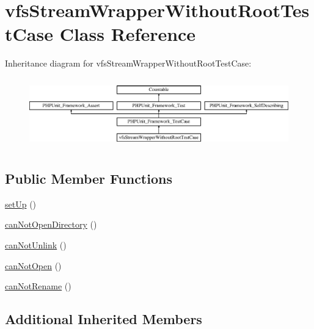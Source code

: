 \hypertarget{classorg_1_1bovigo_1_1vfs_1_1vfs_stream_wrapper_without_root_test_case}{}\section{vfs\+Stream\+Wrapper\+Without\+Root\+Test\+Case Class Reference}
\label{classorg_1_1bovigo_1_1vfs_1_1vfs_stream_wrapper_without_root_test_case}
Inheritance diagram for vfs\+Stream\+Wrapper\+Without\+Root\+Test\+Case\+:\begin{figure}[H]
\begin{center}
\leavevmode
\includegraphics[height=3.072702cm]{classorg_1_1bovigo_1_1vfs_1_1vfs_stream_wrapper_without_root_test_case}
\end{center}
\end{figure}
\subsection*{Public Member Functions}
\begin{DoxyCompactItemize}
\item 
\mbox{\hyperlink{classorg_1_1bovigo_1_1vfs_1_1vfs_stream_wrapper_without_root_test_case_a0bc688732d2b3b162ffebaf7812e78da}{set\+Up}} ()
\item 
\mbox{\hyperlink{classorg_1_1bovigo_1_1vfs_1_1vfs_stream_wrapper_without_root_test_case_aab551e97ca25dae210302e195349f6de}{can\+Not\+Open\+Directory}} ()
\item 
\mbox{\hyperlink{classorg_1_1bovigo_1_1vfs_1_1vfs_stream_wrapper_without_root_test_case_af10590966b43b480b1be5ef3804e0543}{can\+Not\+Unlink}} ()
\item 
\mbox{\hyperlink{classorg_1_1bovigo_1_1vfs_1_1vfs_stream_wrapper_without_root_test_case_a2a1a52209fae941ce1b894a95a505035}{can\+Not\+Open}} ()
\item 
\mbox{\hyperlink{classorg_1_1bovigo_1_1vfs_1_1vfs_stream_wrapper_without_root_test_case_a5ddcb4f2a1f07d233003ea56a8f14468}{can\+Not\+Rename}} ()
\end{DoxyCompactItemize}
\subsection*{Additional Inherited Members}


